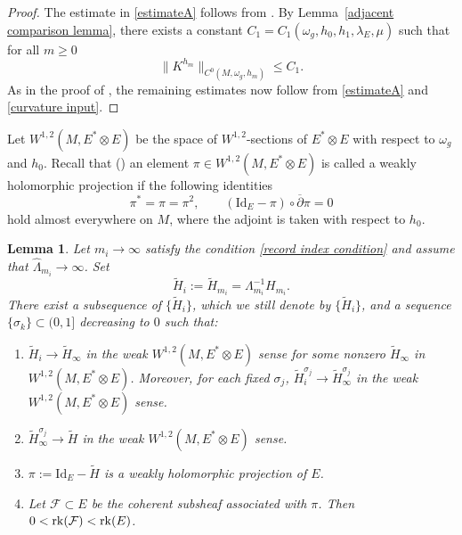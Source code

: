 \documentclass[12pt, reqno]{amsart}
\newcommand\cF{{\mathcal F}}
\newcommand{\id}{\mathrm{Id}}
\newcommand{\rk}{{\rm rk}}
\theoremstyle{plain}
\newtheorem{lemma}[thm]{Lemma}
\theoremstyle{definition}
\newcommand{\blemma}{\begin{lemma}}
\newcommand{\elemma}{\end{lemma}}
\renewcommand{\bar}{\overline}
\newcommand{\beq}{\begin{equation}}
\newcommand{\eeq}{\end{equation}}
\newcommand{\bd}{\begin{enumerate}}
\newcommand{\ed}{\end{enumerate}}
\renewcommand{\hat}{\widehat}
\renewcommand{\tilde}{\widetilde}
\newcommand{\ts}{\otimes}
\renewcommand{\>}{\rightarrow}
\newcommand{\om}{\omega}
\numberwithin{equation}{section}
\begin{document}
\begin{proof}
	The estimate in \eqref{estimateA} follows from \cite[Lemma~4.2]{XYY26b+}.
	By Lemma~\ref{adjacent comparison lemma}, there exists a constant $C_1=C_1(\omega_g, h_0,h_1,\lambda_E ,\mu)$ such that for all $m\geq 0$
	\beq
	\|K^{h_m}\|_{C^0(M,\om_g,h_m)}\leq C_1.\label{curvature input}
	\eeq
	As in the proof of \cite[Propositions~4.3~and~4.4]{XYY26b+}, the remaining estimates now follow from \eqref{estimateA} and \eqref{curvature input}.
\end{proof}
\noindent Let $W^{1,2}(M,E^*\ts E)$ be the space of $W^{1,2}$-sections of $E^*\ts E$ with respect to $\omega_g$ and $h_0$.
 Recall that (\cite{UY86}) an element $\pi\in W^{1,2}(M,E^*\ts E)$ is called a weakly holomorphic projection if the following identities
\begin{equation}
\pi^*=\pi=\pi^2,
\qquad
(\id_E-\pi)\circ\bar\partial\pi=0
\label{weak projection identities}
\end{equation}
hold almost everywhere on $M$,  where the adjoint is taken with respect to $h_0$. 


\blemma\label{power projection extraction}
Let $m_i\to\infty$ satisfy the condition
\eqref{record index condition} and assume that
$\hat\Lambda_{m_i}\to\infty$.  Set
\begin{equation}
\tilde H_i:=\tilde H_{m_i}=\Lambda_{m_i}^{-1}H_{m_i}.
\label{tilde H i proposition definition}
\end{equation}
There exist a subsequence of $\{\tilde{H}_i\}$, which we still denote by 
$\{\tilde{H}_i\}$, and a sequence $\{\sigma_k\} \subset (0,1]$ decreasing to $0$ such that:
\bd
\item $\tilde H_i\> \tilde H_\infty$ in the weak $W^{1,2}(M,E^*\ts E)$ sense for some nonzero $\tilde H_\infty$ in $W^{1,2}(M,E^*\ts E)$.
Moreover, for each fixed $\sigma_j$, $\tilde H_i^{\sigma_j}\> \tilde H^{\sigma_j}_\infty$ in the weak $W^{1,2}(M,E^*\ts E)$ sense.
\item $\tilde H_\infty^{\sigma_j}\> \tilde H$ in the weak $W^{1,2}(M,E^*\ts E)$ sense.
\item $\pi:=\id_E-\tilde H$ is a weakly holomorphic projection of $E$.
\item Let $\cF\subset E$ be the coherent subsheaf associated with $\pi$. Then $0<\rk(\cF)<\rk(E)$.
\ed
\elemma
\end{document}
